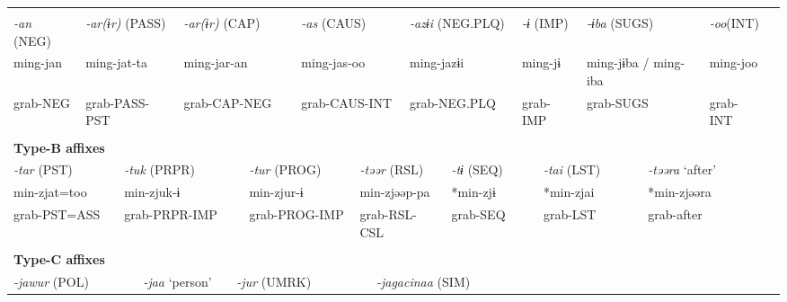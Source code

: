 \tabletail{}
\tablelasttail{}
\begin{tabularx}{\textwidth}{XXXXXXXXXXXXXXXXXXXXXXX}
\lsptoprule
\multicolumn{23}{X}{{\bfseries Type-A affixes}}\\
{ \textit{{}-an} (NEG)} & \multicolumn{4}{X}{{ \textit{{}-ar(ɨr)} (PASS)}} & \multicolumn{4}{X}{{ \textit{{}-ar(ɨr)} (CAP)}} & \multicolumn{4}{X}{{ \textit{{}-as} (CAUS)}} & \multicolumn{3}{X}{{ \textit{{}-azɨi} (NEG.PLQ)}} & \multicolumn{3}{X}{{ \textit{{}-ɨ} (IMP)}} & \multicolumn{2}{X}{{ \textit{{}-ɨba} (SUGS)}} & { \textit{{}-oo}(INT)} & \\
{ ming-jan} & \multicolumn{4}{X}{{ ming-jat-ta}} & \multicolumn{4}{X}{{ ming-jar-an}} & \multicolumn{4}{X}{{ ming-jas-oo}} & \multicolumn{3}{X}{{ ming-jazɨi}} & \multicolumn{3}{X}{{ ming-jɨ}} & \multicolumn{2}{X}{{ ming-jɨba / ming-iba}} & { ming-joo} & \\
grab-NEG & \multicolumn{4}{X}{grab-PASS-PST} & \multicolumn{4}{X}{grab-CAP-NEG} & \multicolumn{4}{X}{grab-CAUS-INT} & \multicolumn{3}{X}{grab-NEG.PLQ} & \multicolumn{3}{X}{grab-IMP} & \multicolumn{2}{X}{grab-SUGS} & grab-INT & \\
\multicolumn{23}{X}{}\\
\multicolumn{23}{X}{{\bfseries Type-B affixes}}\\
\multicolumn{3}{X}{{ \textit{{}-tar} (PST)}} & \multicolumn{5}{X}{{ \textit{{}-tuk} (PRPR)}} & \multicolumn{2}{X}{{ \textit{{}-tur} (PROG)}} & \multicolumn{4}{X}{{ \textit{{}-təər} (RSL)}} & \multicolumn{3}{X}{{ \textit{{}-tɨ} (SEQ)}} & \multicolumn{3}{X}{{ \textit{{}-tai} (LST)}} & \multicolumn{3}{X}{{ \textit{{}-təəra} ‘after’}}\\
\multicolumn{3}{X}{{ min-zjat=too}} & \multicolumn{5}{X}{{ min-zjuk-ɨ}} & \multicolumn{2}{X}{{ min-zjur-ɨ}} & \multicolumn{4}{X}{{ min-zjəəp-pa}} & \multicolumn{3}{X}{{ *min-zjɨ}} & \multicolumn{3}{X}{{ *min-zjai}} & \multicolumn{3}{X}{{ *min-zjəəra}}\\
\multicolumn{3}{X}{grab-PST=ASS} & \multicolumn{5}{X}{grab-PRPR-IMP} & \multicolumn{2}{X}{grab-PROG-IMP} & \multicolumn{4}{X}{grab-RSL-CSL} & \multicolumn{3}{X}{grab-SEQ} & \multicolumn{3}{X}{grab-LST} & \multicolumn{3}{X}{{ grab-after}}\\
\multicolumn{3}{X}{} & \multicolumn{5}{X}{} & \multicolumn{2}{X}{} & \multicolumn{4}{X}{} & \multicolumn{3}{X}{} & \multicolumn{3}{X}{} & \multicolumn{3}{X}{}\\
\multicolumn{23}{X}{{\bfseries Type-C affixes}}\\
\multicolumn{4}{X}{{ \textit{{}-jawur} (POL)}} & \multicolumn{3}{X}{{ \textit{{}-jaa} ‘person’}} & \multicolumn{4}{X}{{ \textit{{}-jur} (UMRK)}} & \multicolumn{4}{X}{{ \textit{{}-jagacinaa} (SIM)}} & \multicolumn{8}{X}{}\\

\end{tabularx}
